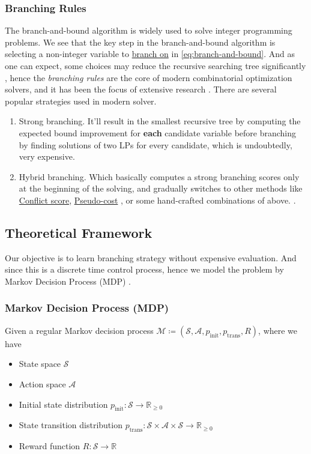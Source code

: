 \documentclass{article}
\begin{document}
\subsubsection{Branching Rules}
The branch-and-bound algorithm is widely used to solve integer programming problems. We see that the key step in the branch-and-bound algorithm is selecting a non-integer
variable to \underline{branch on} in \autoref{eq:branch-and-bound}. And as one can expect, some choices may reduce the recursive searching tree
significantly \cite{B&B.branching-impact}, hence the \emph{branching rules} are the core of modern combinatorial optimization solvers, and it has been the focus of extensive
research \cite{B&B-branching-rules-research-1, B&B-branching-rules-research-2, B&B-branching-rules-research-3, B&B-branching-rules-research-4}. There are several popular
strategies \cite{branching-rules-revisited} used in modern solver.
\begin{enumerate}
	\item Strong branching. It'll result in the smallest recursive tree by computing the expected bound improvement for \textbf{each} candidate variable before branching by
	      finding solutions of two LPs for every candidate, which is undoubtedly, very expensive. \cite{Finding-cuts-in-the-TSP}
	\item Hybrid branching. Which basically computes a strong branching scores only at the beginning of the solving, and gradually switches to other methods like
	      \underline{Conflict score}, \underline{Pseudo-cost} \cite{B&B-branching-rules-research-2}, or some hand-crafted combinations of above. \cite{branching-rules-revisited, B&B-branching-rules-research-4}.
\end{enumerate}

\subsection{Theoretical Framework}
Our objective is to learn branching strategy without expensive evaluation. And since this is a discrete time control process, hence we model the problem by Markov Decision Process (MDP) \cite{howard1960dynamic}.

\subsubsection{Markov Decision Process (MDP)}
Given a regular Markov decision process \(\mathcal{M} \coloneqq (\mathcal{S}, \mathcal{A}, p_{\mathrm{init}}, p_{\mathrm{trans}}, R)\), where we have
\begin{itemize}
	\item State space \(\mathcal{S}\)
	\item Action space \(\mathcal{A}\)
	\item Initial state distribution \(p_{\mathrm{init}}\colon \mathcal{S} \to \mathbb{R}_{\geq 0}\)
	\item State transition distribution \(p_{\mathrm{trans}}\colon \mathcal{S}\times \mathcal{A}\times \mathcal{S} \to \mathbb{R}_{\geq 0}\)
	\item Reward function \(R\colon \mathcal{S} \to \mathbb{R}\)
\end{itemize}
\end{document}
